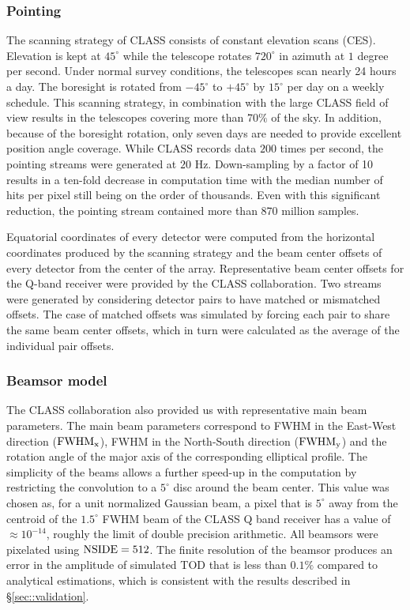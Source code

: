 \documentclass[a4paper,11pt]{article}
\begin{document}
\subsubsection{Pointing}

The scanning strategy of CLASS consists of constant elevation scans (CES). Elevation is kept at $45^{\circ}$ while the telescope rotates $720^\circ$ in azimuth at $1$ degree per second. Under normal survey conditions, the telescopes scan nearly 24 hours a day. The boresight is rotated from $-45^{\circ}$ to $+45^{\circ}$ by $15^{\circ}$ per day on a weekly schedule. This scanning strategy, in combination with the large CLASS field of view results in the telescopes covering more than 70$\%$ of the sky. In addition, because of the boresight rotation, only seven days are needed to provide excellent position angle coverage. While CLASS records data $200$ times per second, the pointing streams were generated at $20$ Hz. Down-sampling by a factor of 10 results in a ten-fold decrease in computation time with the median number of hits per pixel still being on the order of thousands. Even with this significant reduction, the pointing stream contained more than 870 million samples.

Equatorial coordinates of every detector were computed from the horizontal coordinates produced by the scanning strategy and the beam center offsets of every detector from the center of the array.
Representative beam center offsets for the Q-band receiver were provided by the CLASS collaboration. Two streams were generated by considering detector pairs to have matched or mismatched offsets. The case of matched offsets was simulated by forcing each pair to share the same beam center offsets, which in turn were calculated as the average of the individual pair offsets. 

\subsubsection{Beamsor model}

The CLASS collaboration also provided us with representative main beam parameters. The main beam parameters correspond to FWHM in the East-West direction ($\rm{FWHM}_x$), FWHM in the North-South direction ($\rm{FWHM}_y$) and the rotation angle of the major axis of the corresponding elliptical profile. The simplicity of the beams allows a further speed-up in the computation by restricting the convolution to a $5^\circ$ disc around the beam center. This value was chosen as, for a unit normalized Gaussian beam, a pixel that is $5^\circ$ away from the centroid of the $1.5^{\circ}$ FWHM beam of the CLASS Q band receiver has a value of $\approx 10^{-14}$, roughly the limit of double precision arithmetic. All beamsors were pixelated using $\rm{NSIDE}=512$. The finite resolution of the beamsor produces an error in the amplitude of simulated TOD that is less than $0.1\%$ compared to analytical estimations, which is consistent with the results described in \S\ref{sec::validation}.
\end{document}

